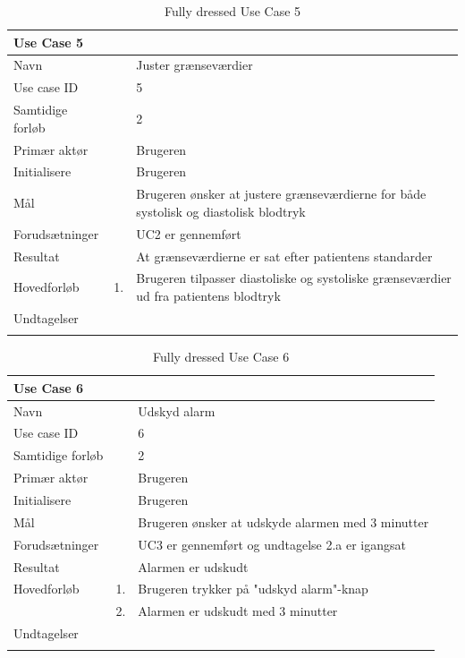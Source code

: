 \begin{longtabu} to  %
    {\large \textbf{Use Case 5}} && \\
    \toprule
    Navn &&    Juster grænseværdier\\
    Use case ID &&    5\\
    Samtidige forløb &&    2\\
    Primær aktør &&    Brugeren\\
    Initialisere &&   Brugeren\\
    Mål && Brugeren ønsker at justere grænseværdierne for både systolisk og diastolisk blodtryk\\
    Forudsætninger && UC2 er gennemført\\
    Resultat &&    At grænseværdierne er sat efter patientens standarder                    \\ \midrule
    Hovedforløb &    1. &    Brugeren tilpasser diastoliske og systoliske grænseværdier ud fra patientens blodtryk\\ \midrule               
    Undtagelser &     &  \\  \bottomrule
\caption{Fully dressed Use Case 5}
\label{UC5}
\end{longtabu}


\begin{longtabu} to  %
    {\large \textbf{Use Case 6}} && \\
    \toprule
    Navn &&    Udskyd alarm\\
    Use case ID &&    6\\
    Samtidige forløb &&    2\\
    Primær aktør &&   Brugeren \\
    Initialisere &&    Brugeren \\
    Mål && Brugeren ønsker at udskyde alarmen med 3 minutter\\
    Forudsætninger && UC3 er gennemført og undtagelse 2.a er igangsat\\
    Resultat &&    Alarmen er udskudt                  \\ \midrule
    Hovedforløb &    1. &    Brugeren trykker på "udskyd alarm"\--knap  \\ 
    			&	 2.	&	 Alarmen er udskudt med 3 minutter \\ \midrule 		
    Undtagelser &     \\ \bottomrule
\caption{Fully dressed Use Case 6}
\label{UC6}
\end{longtabu}


